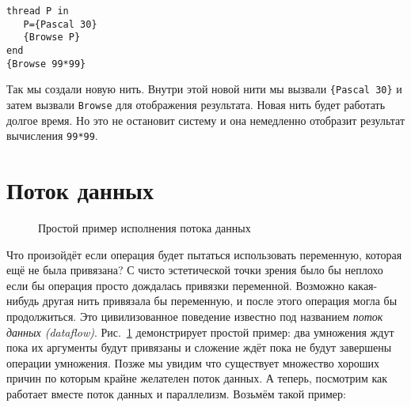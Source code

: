 \begin{lstlisting}
thread P in
   P={Pascal 30}
   {Browse P}
end
{Browse 99*99}
\end{lstlisting}

Так мы создали новую нить. Внутри этой новой нити мы вызвали \lstinline|{Pascal 30}| и затем вызвали \lstinline|Browse| для отображения результата. Новая нить будет работать долгое время. Но это не остановит систему и она немедленно отобразит результат вычисления \lstinline|99*99|.

\section{Поток данных}

\begin{figure}
\caption{Простой пример исполнения потока данных}
\label{figure:Dataflow_execution_simple_example}
\end{figure}
Что произойдёт если операция будет пытаться использовать переменную, которая ещё не была привязана? С чисто эстетической точки зрения было бы неплохо если бы операция просто дождалась привязки переменной. Возможно какая-нибудь другая нить привязала бы переменную, и после этого операция могла бы продолжиться. Это цивилизованное поведение известно под названием \emph{поток данных (dataflow)}. Рис.~\ref{figure:Dataflow_execution_simple_example} демонстрирует простой пример: два умножения ждут пока их аргументы будут привязаны и сложение ждёт пока не будут завершены операции умножения. Позже мы увидим что существует множество хороших причин по которым крайне желателен поток данных. А теперь, посмотрим как работает вместе поток данных и параллелизм. Возьмём такой пример:

